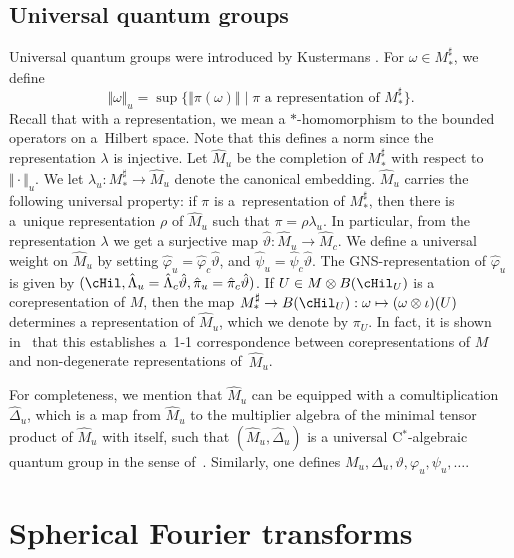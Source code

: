 \subsection*{Universal quantum groups}
Universal quantum groups were introduced by Kustermans \cite{Kus}.
 For $\omega \in M_\ast^\sharp$, we def\/ine
\[
    \Vert \omega \Vert_u = \sup \{ \Vert \pi(\omega) \Vert \mid \pi \textrm{ a }   \textrm{representation of } M_\ast^\sharp   \}.
\]
Recall that with a representation, we mean a $\ast$-homomorphism to the bounded operators on a~Hilbert space.
Note that this def\/ines a norm since the representation $\lambda$ is injective.
 Let $\hat{M}_u$ be the completion of $M_\ast^\sharp$ with respect to $\Vert \cdot \Vert_u$. We let $\lambda_u: M_\ast^\sharp \rightarrow \hat{M}_u$ denote the canonical embedding. $\hat{M}_u$ carries the following universal property: if $\pi$ is a~representation of $M_\ast^\sharp$, then there is a~unique representation $\rho$ of $\hat{M}_u$ such that $\pi = \rho \lambda_u$. In particular, from the representation $\lambda$ we get a surjective map $\hat{\vartheta}: \hat{M}_u \rightarrow \hat{M}_c$. We def\/ine a universal weight on $\hat{M}_u$ by setting $\hat{\varphi}_u = \hat{\varphi}_c \hat{\vartheta}$, and $\hat{\psi}_u = \hat{\psi}_c \hat{\vartheta}$. The GNS-representation of $\hat{\varphi}_u$ is given by $(\cHil, \hat{\Lambda}_u = \hat{\Lambda}_c \hat{\vartheta}, \hat{\pi}_u = \hat{\pi}_c \hat{\vartheta})$. If $U \in M \otimes B(\cHil_U)$ is a corepresentation of $M$, then the map $M_\ast^\sharp \rightarrow B(\cHil_U): \omega \mapsto (\omega \otimes \iota)(U)$ determines a representation of $\hat{M}_u$, which we denote by $\pi_U$. In fact, it is shown in~\cite{Kus} that this establishes a~1-1 correspondence between corepresentations of $M$ and non-degenerate representations of~$\hat{M}_u$.

For completeness, we mention that $\hat{M}_u$ can be equipped with a comultiplication $\hat{\Delta}_u$, which is a map from $\hat{M}_u$ to the multiplier algebra of the minimal tensor product of $\hat{M}_u$ with itself, such that $(\hat{M}_u, \hat{\Delta}_u)$ is a universal C$^\ast$-algebraic quantum group in the sense of~\cite{Kus}.
Similarly, one def\/ines $M_u, \Delta_u, \vartheta, \varphi_u, \psi_u, \ldots$.


\section{Spherical Fourier transforms}\label{SectHomogeneousSpaces}


